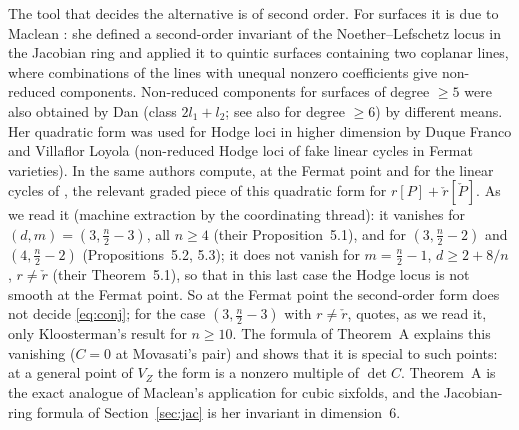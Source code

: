\documentclass[10pt]{article}
\numberwithin{equation}{section}
\theoremstyle{remark}
\newcommand{\VZ}{V_Z}
\begin{document}
The tool that decides the alternative is of second order. For surfaces it is due to Maclean \cite{Mac1,Mac2}:
she defined a second-order invariant of the Noether--Lefschetz locus in the Jacobian ring and applied it to
quintic surfaces containing two coplanar lines, where combinations of the lines with unequal nonzero coefficients
give non-reduced components. Non-reduced components for surfaces of degree $\ge5$ were also obtained by Dan
\cite[Theorem~1.3]{Dan} (class $2l_1+l_2$; see also \cite{Dan2} for degree $\ge6$) by different means. Her
quadratic form was used for Hodge loci in higher dimension by Duque Franco and Villaflor Loyola \cite{DFV}
(non-reduced Hodge loci of fake linear cycles in Fermat varieties). In \cite[\S5]{DFV2} the same authors compute,
at the Fermat point and for the linear cycles of \cite{Mo1}, the relevant graded piece of this quadratic form for
$r[P]+\check r[\check P]$. As we read it (machine extraction by the coordinating thread): it vanishes for
$(d,m)=(3,\tfrac n2-3)$, all $n\ge4$ (their Proposition~5.1), and for $(3,\tfrac n2-2)$ and $(4,\tfrac n2-2)$
(Propositions~5.2, 5.3); it does not vanish for $m=\tfrac n2-1$, $d\ge2+8/n$, $r\ne\check r$ (their Theorem~5.1),
so that in this last case the Hodge locus is not smooth at the Fermat point. So at the Fermat point the
second-order form does not decide \eqref{eq:conj}; for the case $(3,\tfrac n2-3)$ with $r\ne\check r$,
\cite{DFV2} quotes, as we read it, only Kloosterman's result for $n\ge10$. The formula of Theorem~A explains this vanishing ($C=0$ at Movasati's
pair) and shows that it is special to such points: at a general point of $\VZ$ the form is a nonzero multiple of
$\det C$. Theorem~A is the exact analogue of Maclean's
application for cubic sixfolds, and the Jacobian-ring formula of Section~\ref{sec:jac} is her invariant in
dimension~$6$.
\end{document}
